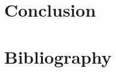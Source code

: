 \documentclass[a4paper,twocolumn,twoside,notitlepage,10pt]{article}
\begin{document}
\section{Conclusion}

\section{Bibliography}

\onecolumn
\end{document}
